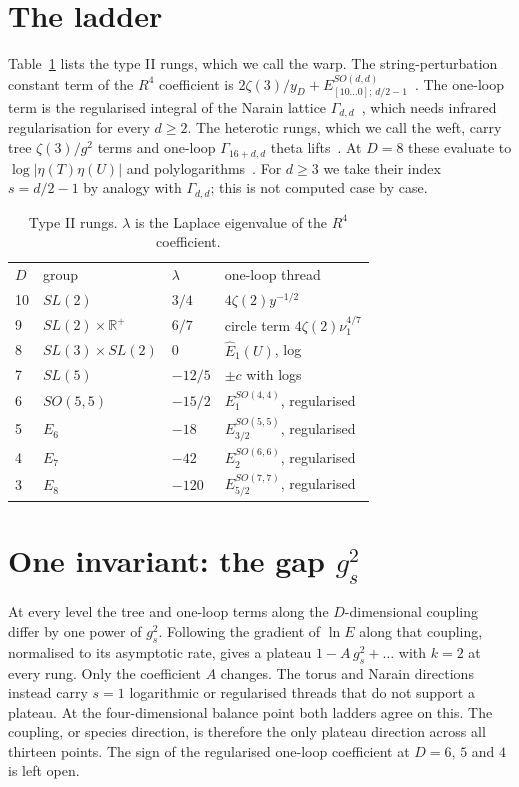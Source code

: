 \documentclass[aps,prd,twocolumn,superscriptaddress,nofootinbib,showkeys]{revtex4-2}
\begin{document}
\section{The ladder}
Table~\ref{tab:L} lists the type II rungs, which we call the warp. The string-perturbation constant term of the $R^4$ coefficient is $2\zeta(3)/y_D+E^{SO(d,d)}_{[10\ldots0];\,d/2-1}$~\cite{GRV,GRV2}. The one-loop term is the regularised integral of the Narain lattice $\Gamma_{d,d}$~\cite{OP}, which needs infrared regularisation for every $d\ge2$. The heterotic rungs, which we call the weft, carry tree $\zeta(3)/g^2$ terms and one-loop $\Gamma_{16+d,d}$ theta lifts~\cite{KOP,BFKOV,AFP}. At $D=8$ these evaluate to $\log|\eta(T)\eta(U)|$ and polylogarithms~\cite{FS}. For $d\ge3$ we take their index $s=d/2-1$ by analogy with $\Gamma_{d,d}$; this is not computed case by case.
\begin{table}[b]\caption{Type II rungs. $\lambda$ is the Laplace eigenvalue of the $R^4$ coefficient.}\label{tab:L}
\begin{ruledtabular}\footnotesize\begin{tabular}{llll}
$D$ & group & $\lambda$ & one-loop thread\\
10 & $SL(2)$ & $3/4$ & $4\zeta(2)y^{-1/2}$\\
9 & $SL(2)\times\mathbb R^+$ & $6/7$ & circle term $4\zeta(2)\nu_1^{4/7}$\\
8 & $SL(3)\times SL(2)$ & $0$ & $\hat E_1(U)$, log\\
7 & $SL(5)$ & $-12/5$ & $\pm c$ with logs\\
6 & $SO(5,5)$ & $-15/2$ & $E^{SO(4,4)}_1$, regularised\\
5 & $E_6$ & $-18$ & $E^{SO(5,5)}_{3/2}$, regularised\\
4 & $E_7$ & $-42$ & $E^{SO(6,6)}_2$, regularised\\
3 & $E_8$ & $-120$ & $E^{SO(7,7)}_{5/2}$, regularised\\
\end{tabular}\end{ruledtabular}\end{table}

\section{One invariant: the gap $g_s^2$}
At every level the tree and one-loop terms along the $D$-dimensional coupling differ by one power of $g_s^2$. Following the gradient of $\ln E$ along that coupling, normalised to its asymptotic rate, gives a plateau $1-A\,g_s^2+\ldots$ with $k=2$ at every rung. Only the coefficient $A$ changes. The torus and Narain directions instead carry $s=1$ logarithmic or regularised threads that do not support a plateau. At the four-dimensional balance point both ladders agree on this. The coupling, or species direction, is therefore the only plateau direction across all thirteen points. The sign of the regularised one-loop coefficient at $D=6$, $5$ and $4$ is left open.
\end{document}
